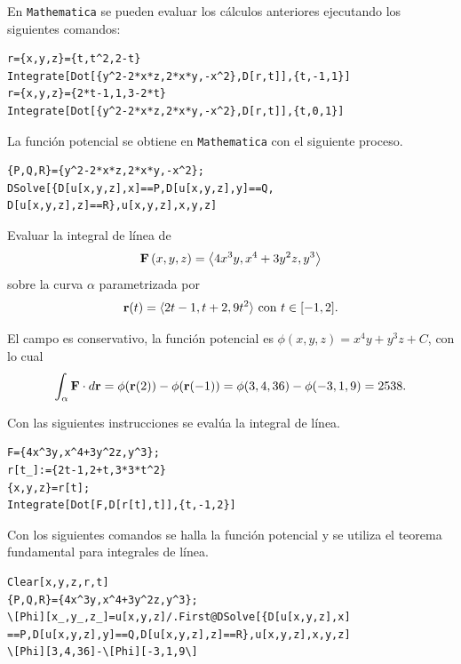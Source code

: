 En \verb"Mathematica" se pueden evaluar los cálculos anteriores ejecutando los siguientes comandos:

\begin{tcolorbox}[title=\bf Instrucción \verb"Mathematica"]\begin{Verbatim}[formatcom=\letraverbatim]
r={x,y,z}={t,t^2,2-t}
Integrate[Dot[{y^2-2*x*z,2*x*y,-x^2},D[r,t]],{t,-1,1}]
r={x,y,z}={2*t-1,1,3-2*t}
Integrate[Dot[{y^2-2*x*z,2*x*y,-x^2},D[r,t]],{t,0,1}]
\end{Verbatim}
\end{tcolorbox}

La función potencial se obtiene en \verb"Mathematica" con el siguiente proceso.

\begin{tcolorbox}[title=\bf Instrucción \verb"Mathematica"]\begin{Verbatim}[formatcom=\letraverbatim]
{P,Q,R}={y^2-2*x*z,2*x*y,-x^2};
DSolve[{D[u[x,y,z],x]==P,D[u[x,y,z],y]==Q,
D[u[x,y,z],z]==R},u[x,y,z],x,y,z]
\end{Verbatim}
\end{tcolorbox}

\begin{ejemplo}
Evaluar la integral de línea de
\[{\bf F}\left( x,y,z\right) =\left\langle 4 x^3 y,x^4+3 y^2 z,y^3 \right\rangle\]
sobre la curva $\alpha$ parametrizada por
\[{\bf r}(t)=\langle 2 t-1,t+2,9 t^2 \rangle \text{ con } t \in [-1,2].\]

El campo es conservativo, la función potencial es $\phi(x,y,z)=x^4 y+y^3z+C$, con lo cual
\[\int_\alpha{\bf F} \cdot d{\bf r}=\phi({\bf r}(2))-\phi({\bf r}(-1))=\phi(3,4,36)-\phi(-3,1,9)=2538.\]
\end{ejemplo}

Con las siguientes instrucciones se evalúa la integral de línea.

\begin{tcolorbox}[title=\bf Instrucción \verb"Mathematica"]\begin{Verbatim}[formatcom=\letraverbatim]
F={4x^3y,x^4+3y^2z,y^3};
r[t_]:={2t-1,2+t,3*3*t^2}
{x,y,z}=r[t];
Integrate[Dot[F,D[r[t],t]],{t,-1,2}]
\end{Verbatim}
\end{tcolorbox}

Con los siguientes comandos se halla la función potencial y se utiliza el teorema fundamental para integrales de línea.

\begin{tcolorbox}[title=\bf Instrucción \verb"Mathematica"]\begin{Verbatim}[formatcom=\letraverbatim]
Clear[x,y,z,r,t]
{P,Q,R}={4x^3y,x^4+3y^2z,y^3};
\[Phi][x_,y_,z_]=u[x,y,z]/.First@DSolve[{D[u[x,y,z],x]
==P,D[u[x,y,z],y]==Q,D[u[x,y,z],z]==R},u[x,y,z],x,y,z]
\[Phi][3,4,36]-\[Phi][-3,1,9\]
\end{Verbatim}
\end{tcolorbox}

